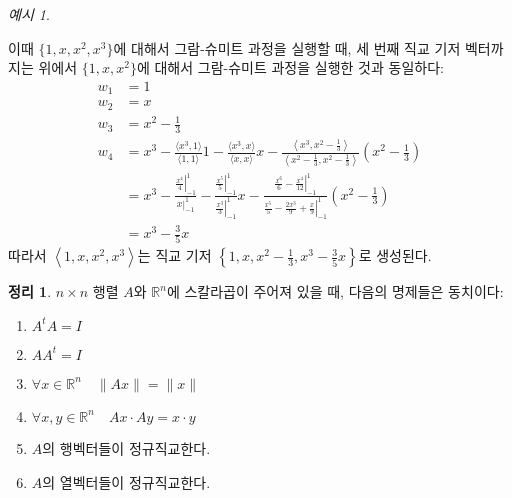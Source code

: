 \documentclass[unfonts,oneside,a4paper]{oblivoir}
\theoremstyle{definition}
\theoremstyle{theorem}
\newtheorem{theorem}{정리}[section]
\theoremstyle{theorem}
\theoremstyle{remark}
\theoremstyle{remark}
\theoremstyle{remark}
\newtheorem*{example}{예시}
\theoremstyle{remark}
\renewcommand{\vec}[1]{\bm{\mathit{#1}}}
\begin{document}
\begin{example}
\begin{enumerate}
            이때 $\{1, x, x^2, x^3\}$에 대해서 그람-슈미트 과정을 실행할 때, 세 번째 직교 기저 벡터까지는 위에서 $\{1, x, x^2\}$에 대해서 그람-슈미트 과정을 실행한 것과 동일하다:
            \begin{align*}
                \vec w_1 &= 1\\
                \vec w_2 &= x\\
                \vec w_3 &= x^2 - \frac13\\
                \vec w_4 &= x^3 - \frac{\langle x^3, 1 \rangle}{\langle 1, 1\rangle} 1 - \frac{\langle x^3, x\rangle}{\langle x, x \rangle} x - \frac{\left\langle x^3, x^2 - \frac13\right\rangle}{\left\langle x^2 - \frac13, x^2 - \frac13 \right\rangle} \left(x^2 - \frac13\right)\\
                         &= x^3 - \frac{\left.\frac{x^4}{4}\right|_{-1}^1}{\left. x \right|_{-1}^1} - \frac{\left. \frac{x^5}{5} \right|_{-1}^1}{\left. \frac{x^3}{3} \right|_{-1}^1} x - \frac{\left. \frac{x^6}{6} - \frac{x^4}{12} \right|_{-1}^1}{\left. \frac{x^5}{5} - \frac{2x^3}{9} + \frac x9 \right|_{-1}^1}\left(x^2 - \frac13\right)\\
                         &= x^3 - \frac{3}{5}x
            \end{align*}
            따라서 $\left< 1, x, x^2, x^3 \right>$는 직교 기저 $\left\{1, x, x^2 - \frac13, x^3 - \frac{3}{5}x\right\}$로 생성된다.
    \end{enumerate}
\end{example}

\begin{theorem} \label{thm:orthogonal_mat}
    $n \times n$ 행렬 $A$와 $\mathbb R^n$에 스칼라곱이 주어져 있을 때, 다음의 명제들은 동치이다:
    \begin{enumerate}
        \item $A^t A = I$
        \item $A A^t = I$
        \item $\forall \vec x \in \mathbb R^n \quad \lVert A \vec x \rVert = \lVert \vec x \rVert$
        \item $\forall \vec x, \vec y \in \mathbb R^n \quad A \vec x \cdot A \vec y = \vec x \cdot \vec y$
        \item $A$의 행벡터들이 정규직교한다.
        \item $A$의 열벡터들이 정규직교한다.
    \end{enumerate}
\end{theorem}
\end{document}
